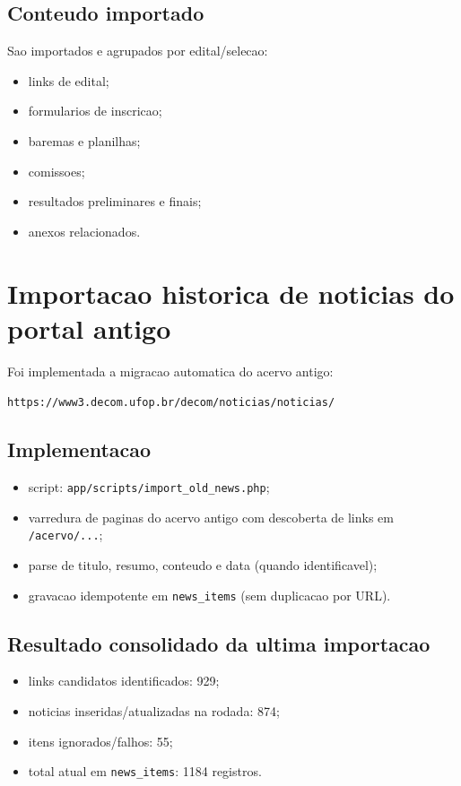 \documentclass[12pt,a4paper]{article}
\begin{document}
\subsection{Conteudo importado}
Sao importados e agrupados por edital/selecao:
\begin{itemize}
    \item links de edital;
    \item formularios de inscricao;
    \item baremas e planilhas;
    \item comissoes;
    \item resultados preliminares e finais;
    \item anexos relacionados.
\end{itemize}

\section{Importacao historica de noticias do portal antigo}
Foi implementada a migracao automatica do acervo antigo:
\begin{center}
\texttt{https://www3.decom.ufop.br/decom/noticias/noticias/}
\end{center}

\subsection{Implementacao}
\begin{itemize}
    \item script: \texttt{app/scripts/import\_old\_news.php};
    \item varredura de paginas do acervo antigo com descoberta de links em \texttt{/acervo/...};
    \item parse de titulo, resumo, conteudo e data (quando identificavel);
    \item gravacao idempotente em \texttt{news\_items} (sem duplicacao por URL).
\end{itemize}

\subsection{Resultado consolidado da ultima importacao}
\begin{itemize}
    \item links candidatos identificados: 929;
    \item noticias inseridas/atualizadas na rodada: 874;
    \item itens ignorados/falhos: 55;
    \item total atual em \texttt{news\_items}: 1184 registros.
\end{itemize}
\end{document}
